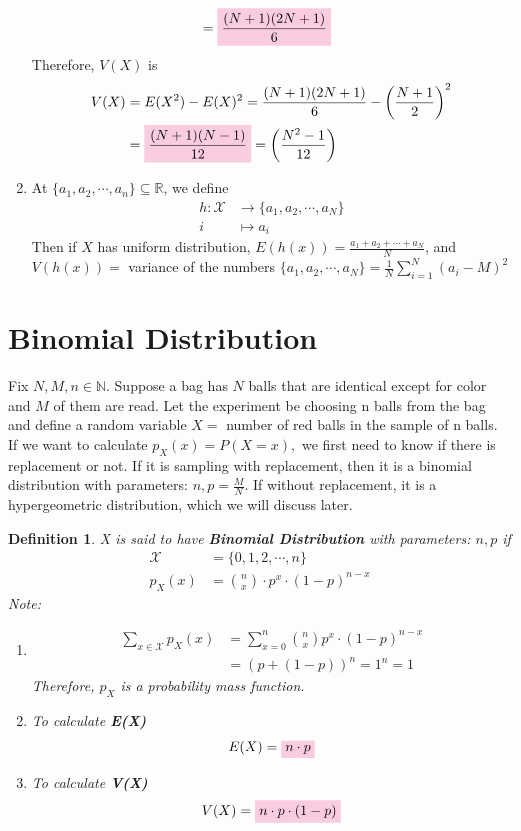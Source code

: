 \documentclass[11pt,oneside]{book}
\theoremstyle{newStyle}
\newtheorem{defn}[thm]{Definition}
\newcommand{\R}{\mathbb{R}}
\newcommand{\N}{\mathbb{N}}
\newcommand{\X}{\mathcal{X}}
\newcommand{\note}{\color{red}Note: \color{black}}
\begin{document}
\begin{enumerate}
\begin{align*}
&=\text{\colorbox{pink}{$\frac{(N+1)(2N+1)}{6}$}}
\end{align*}
Therefore, $V(X)$ is \begin{align*}
V(X)&=E(X^2)-E(X)^2=\frac{(N+1)(2N+1)}{6}-\left(\frac{N+1}{2} \right)^2\\
&=\text{\colorbox{pink}{$\frac{(N+1)(N-1)}{12}$}}=\left(\frac{N^2-1}{12} \right)
\end{align*}
\item At $\{a_1,a_2,\cdots,a_n\}\subseteq \R$, we define \begin{align*}
h:\X &\longrightarrow \{a_1,a_2,\cdots,a_N\}\\
i&\mapsto a_i
\end{align*}
Then if $X$ has uniform distribution, $E(h(x))=\frac{a_1+a_2+\cdots+a_N}{N}$, and $V(h(x))=$ variance of the numbers $\{a_1,a_2,\cdots,a_N\}=\frac{1}{N}\sum_{i=1}^{N}(a_i-M)^2$
\end{enumerate}
\section[Binomial Distribution]{Binomial Distribution}
Fix $N,M,n\in \N$. Suppose a bag has $N$ balls that are identical except for color and $M$ of them are read. Let the experiment be choosing n balls from the bag and define a random variable $X=$ number of red balls in the sample of n balls.\\
If we want to calculate $p_X(x)=P(X=x),$ we first need to know if there is replacement or not. If it is sampling with replacement, then it is a binomial distribution with parameters: $n,p=\frac{M}{N}$. If without replacement, it is a hypergeometric distribution, which we will discuss later. \begin{defn}
X is said to have \textbf{Binomial Distribution} with parameters: $n,p$ if \begin{align*}
\X&=\{0,1,2,\cdots,n\}\\
p_X(x)&=\binom nx \cdot p^x\cdot (1-p)^{n-x}
\end{align*}
\note \begin{enumerate}
\item \begin{align*}
\sum_{x\in \X}p_X(x)&=\sum_{x=0}^{n}\binom nx p^x\cdot (1-p)^{n-x}\\
&=(p+(1-p))^n=1^n=1
\end{align*}
Therefore, $p_X$ is a probability mass function.
\item To calculate \textbf{E(X)}\begin{align*}
E(X)=\text{\colorbox{pink}{$n\cdot p$}}
\end{align*}
\item To calculate \textbf{V(X)}\begin{align*}
V(X)=\text{\colorbox{pink}{$n\cdot p \cdot (1-p)$}}
\end{align*}
\end{enumerate}
\end{defn}
\end{document}
